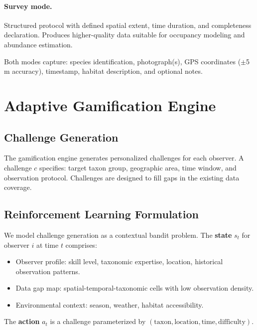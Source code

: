 \documentclass[11pt,a4paper]{article}
\begin{document}
\paragraph{Survey mode.} Structured protocol with defined spatial extent,
time duration, and completeness declaration. Produces higher-quality data
suitable for occupancy modeling and abundance estimation.

Both modes capture: species identification, photograph(s), GPS
coordinates ($\pm$5\,m accuracy), timestamp, habitat description, and
optional notes.


\section{Adaptive Gamification Engine}
\label{sec:gamification}

\subsection{Challenge Generation}

The gamification engine generates personalized challenges for each
observer. A challenge $c$ specifies: target taxon group, geographic
area, time window, and observation protocol. Challenges are designed
to fill gaps in the existing data coverage.

\subsection{Reinforcement Learning Formulation}

We model challenge generation as a contextual bandit problem. The
\textbf{state} $s_t$ for observer $i$ at time $t$ comprises:
\begin{itemize}
  \item Observer profile: skill level, taxonomic expertise, location,
    historical observation patterns.
  \item Data gap map: spatial-temporal-taxonomic cells with low
    observation density.
  \item Environmental context: season, weather, habitat accessibility.
\end{itemize}

The \textbf{action} $a_t$ is a challenge parameterized by
$(\text{taxon}, \text{location}, \text{time}, \text{difficulty})$.
\end{document}
